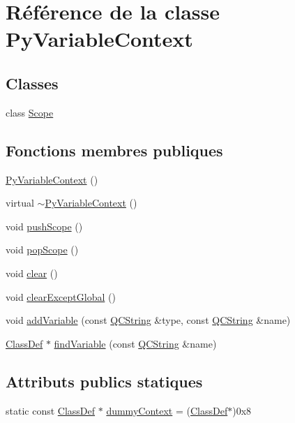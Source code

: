 \hypertarget{class_py_variable_context}{}\section{Référence de la classe Py\+Variable\+Context}
\label{class_py_variable_context}
\subsection*{Classes}
\begin{DoxyCompactItemize}
\item 
class \hyperlink{class_py_variable_context_1_1_scope}{Scope}
\end{DoxyCompactItemize}
\subsection*{Fonctions membres publiques}
\begin{DoxyCompactItemize}
\item 
\hyperlink{class_py_variable_context_a4c80edb02ccb43dec43b2aa7a47276ff}{Py\+Variable\+Context} ()
\item 
virtual \hyperlink{class_py_variable_context_aa8d32a2fb55030b7fb33c7b482e39c01}{$\sim$\+Py\+Variable\+Context} ()
\item 
void \hyperlink{class_py_variable_context_a0546bb3cb235db78d2e8fcbb1dcb6502}{push\+Scope} ()
\item 
void \hyperlink{class_py_variable_context_ae24b90d1862e5ea27664f1d5adbf215a}{pop\+Scope} ()
\item 
void \hyperlink{class_py_variable_context_adba488d880f24fee22111357a13c2d4f}{clear} ()
\item 
void \hyperlink{class_py_variable_context_aa324279947b58bc2b6fe6566a5413988}{clear\+Except\+Global} ()
\item 
void \hyperlink{class_py_variable_context_a0aeecbdf9dfc4ac3e3680e48531e4300}{add\+Variable} (const \hyperlink{class_q_c_string}{Q\+C\+String} \&type, const \hyperlink{class_q_c_string}{Q\+C\+String} \&name)
\item 
\hyperlink{class_class_def}{Class\+Def} $\ast$ \hyperlink{class_py_variable_context_a9fc4eb25a82e2566d2b6bdab62fbd5d7}{find\+Variable} (const \hyperlink{class_q_c_string}{Q\+C\+String} \&name)
\end{DoxyCompactItemize}
\subsection*{Attributs publics statiques}
\begin{DoxyCompactItemize}
\item 
static const \hyperlink{class_class_def}{Class\+Def} $\ast$ \hyperlink{class_py_variable_context_abb3568aff90a5041f86f2219974acc97}{dummy\+Context} = (\hyperlink{class_class_def}{Class\+Def}$\ast$)0x8
\end{DoxyCompactItemize}


